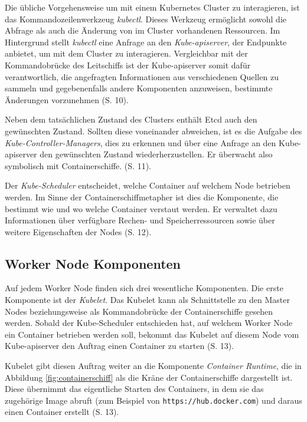 \documentclass[11pt,a4paper]{article}
\begin{document}
Die übliche Vorgehensweise um mit einem Kubernetes Cluster zu interagieren, ist das Kommandozeilenwerkzeug \emph{kubectl}.
Dieses Werkzeug ermöglicht sowohl die Abfrage als auch die Änderung von im Cluster vorhandenen Ressourcen.
Im Hintergrund stellt \emph{kubectl} eine Anfrage an den \emph{Kube-apiserver}, der Endpunkte anbietet,
um mit dem Cluster zu interagieren. Vergleichbar mit der Kommandobrücke des Leitschiffs ist der Kube-apiserver
somit dafür verantwortlich, die angefragten Informationen
aus verschiedenen Quellen zu sammeln und gegebenenfalls andere Komponenten anzuweisen, bestimmte Änderungen vorzunehmen \cite{Schmeling_Dargatz_2022} (S. 10).

Neben dem tatsächlichen Zustand des Clusters enthält Etcd auch den gewünschten Zustand.
Sollten diese voneinander abweichen, ist es die Aufgabe des \emph{Kube-Controller-Managers},
dies zu erkennen und über eine Anfrage an den Kube-apiserver den gewünschten Zustand wiederherzustellen.
Er überwacht also symbolisch mit Containerschiffe. \cite{Schmeling_Dargatz_2022} (S. 11).

Der \emph{Kube-Scheduler} entscheidet, welche Container auf welchem Node betrieben werden.
Im Sinne der Containerschiffmetapher ist dies die Komponente, die bestimmt
wie und wo welche Container verstaut werden.
Er verwaltet dazu Informationen über verfügbare Rechen- und Speicherressourcen sowie über weitere Eigenschaften
der Nodes \cite{Schmeling_Dargatz_2022} (S. 12).

\subsection{Worker Node Komponenten}
\label{sec:WorkerNodeKomponenten}
Auf jedem Worker Node finden sich drei wesentliche Komponenten.
Die erste Komponente ist der \emph{Kubelet}. Das Kubelet kann als Schnittstelle
zu den Master Nodes beziehungsweise als Kommandobrücke der Containerschiffe gesehen werden.
Sobald der Kube-Scheduler entschieden hat, auf welchem
Worker Node ein Container betrieben werden soll, bekommt das Kubelet auf diesem Node
vom Kube-apiserver den Auftrag einen Container zu starten \cite{Schmeling_Dargatz_2022} (S. 13).

Kubelet gibt diesen Auftrag weiter an die Komponente \emph{Container Runtime}, die
in Abbildung \ref{fig:containerschiff} als die Kräne der Containerschiffe dargestellt ist.
Diese übernimmt das eigentliche Starten des Containers, in dem sie das zugehörige Image
abruft (zum Beispiel von \lstinline|https://hub.docker.com|) und daraus einen Container erstellt \cite{Schmeling_Dargatz_2022} (S. 13).
\end{document}
